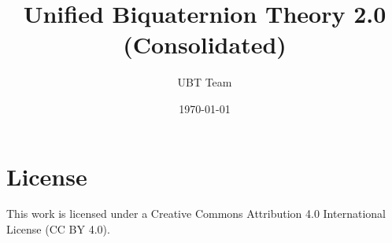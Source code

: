 \documentclass[12pt]{article}
\title{Unified Biquaternion Theory 2.0 (Consolidated)}
\author{UBT Team}
\date{\today}
\begin{document}
\maketitle
\tableofcontents

\appendix













\section*{License}
This work is licensed under a Creative Commons Attribution 4.0 International License (CC BY 4.0).
\end{document}
